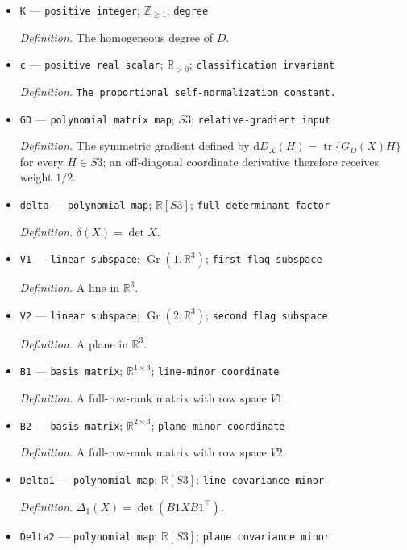 \documentclass{article}
\begin{document}
\begin{itemize}
  \item \texttt{K} --- \texttt{positive integer}; \(\mathbb Z_{\geq1}\); \texttt{degree}
  \par\smallskip\noindent\emph{Definition.} The homogeneous degree of \(D\).
  \item \texttt{c} --- \texttt{positive real scalar}; \(\mathbb R_{>0}\); \texttt{classification invariant}
  \par\smallskip\noindent\emph{Definition.} \texttt{The proportional self-\allowbreak{}normalization constant.}
  \item \texttt{GD} --- \texttt{polynomial matrix map}; \(S3\); \texttt{relative-\allowbreak{}gradient input}
  \par\smallskip\noindent\emph{Definition.} The symmetric gradient defined by \(\mathrm dD_X(H)=\operatorname{tr}\{G_D(X)H\}\) for every \(H\in S3\); an off-diagonal coordinate derivative therefore receives weight \(1/2\).
  \item \texttt{delta} --- \texttt{polynomial map}; \(\mathbb R[S3]\); \texttt{full determinant factor}
  \par\smallskip\noindent\emph{Definition.} \(\delta(X)=\det X\).
  \item \texttt{V1} --- \texttt{linear subspace}; \(\operatorname{Gr}(1,\mathbb R^3)\); \texttt{first flag subspace}
  \par\smallskip\noindent\emph{Definition.} A line in \(\mathbb R^3\).
  \item \texttt{V2} --- \texttt{linear subspace}; \(\operatorname{Gr}(2,\mathbb R^3)\); \texttt{second flag subspace}
  \par\smallskip\noindent\emph{Definition.} A plane in \(\mathbb R^3\).
  \item \texttt{B1} --- \texttt{basis matrix}; \(\mathbb R^{1\times3}\); \texttt{line-\allowbreak{}minor coordinate}
  \par\smallskip\noindent\emph{Definition.} A full-row-rank matrix with row space \(V1\).
  \item \texttt{B2} --- \texttt{basis matrix}; \(\mathbb R^{2\times3}\); \texttt{plane-\allowbreak{}minor coordinate}
  \par\smallskip\noindent\emph{Definition.} A full-row-rank matrix with row space \(V2\).
  \item \texttt{Delta1} --- \texttt{polynomial map}; \(\mathbb R[S3]\); \texttt{line covariance minor}
  \par\smallskip\noindent\emph{Definition.} \(\Delta_1(X)=\det(B1XB1^{\top})\).
  \item \texttt{Delta2} --- \texttt{polynomial map}; \(\mathbb R[S3]\); \texttt{plane covariance minor}

\end{itemize}
\end{document}
